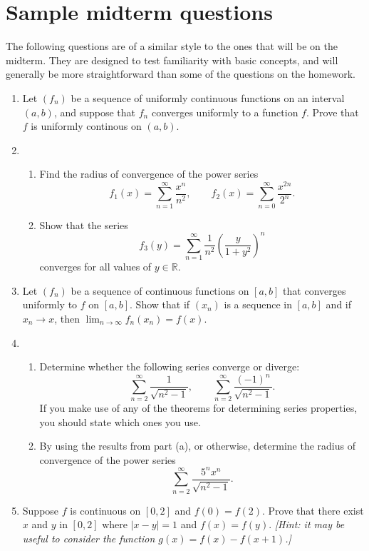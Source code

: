 \documentclass[12pt]{article}
\newcommand{\R}{\mathbb{R}}
\begin{document}
\section*{Sample midterm questions}
The following questions are of a similar style to the ones that will be on the
midterm. They are designed to test familiarity with basic concepts, and will
generally be more straightforward than some of the questions on the homework.
\begin{enumerate}
  \item Let $(f_n)$ be a sequence of uniformly continuous functions on an
    interval $(a,b)$, and suppose that $f_n$ converges uniformly to a function
    $f$. Prove that $f$ is uniformly continous on $(a,b)$.
  \item
    \begin{enumerate}
      \item Find the radius of convergence of the power series
	\[
	f_1(x)=\sum_{n=1}^\infty \frac{x^n}{n^2}, \qquad f_2(x)=\sum_{n=0}^\infty
	\frac{x^{2n}}{2^n}.
        \]
      \item Show that the series
	\[
	f_3(y)=\sum_{n=1}^\infty \frac{1}{n^2} \left( \frac{y}{1+y^2}\right)^n
	\]
	converges for all values of $y\in \R$.
    \end{enumerate}
  \item Let $(f_n)$ be a sequence of continuous functions on $[a,b]$ that
    converges uniformly to $f$ on $[a,b]$. Show that if $(x_n)$ is a sequence
    in $[a,b]$ and if $x_n \to x$, then $\lim_{n\to \infty} f_n(x_n) = f(x)$.
  \item
    \begin{enumerate}
      \item Determine whether the following series converge or diverge:
        \[
          \sum_{n=2}^\infty \frac{1}{\sqrt{n^2-1}}, \qquad \sum_{n=2}^\infty \frac{(-1)^n}{\sqrt{n^2-1}}.
        \]
        If you make use of any of the theorems for determining series
        properties, you should state which ones you use.
      \item By using the results from part (a), or otherwise, determine
        the radius of convergence of the power series
        \[
          \sum_{n=2}^\infty \frac{5^n x^n}{\sqrt{n^2-1}}.
        \]
    \end{enumerate}
  \item Suppose $f$ is continuous on $[0,2]$ and $f(0)=f(2)$. Prove that there exist
    $x$ and $y$ in $[0,2]$ where $|x-y|=1$ and $f(x)=f(y)$. \textit{[Hint: it
    may be useful to consider the function $g(x)=f(x)-f(x+1)$.]}

\end{enumerate}
\end{document}
